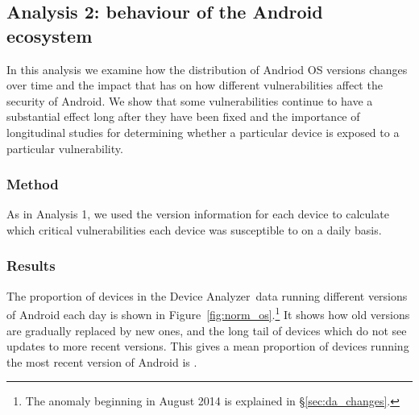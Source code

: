 \documentclass{llncs}
\newcommand{\da}{Device Analyzer}
\begin{document}
\subsection{Analysis 2: behaviour of the Android ecosystem}\label{sec:exp:android_ecosystem}
In this analysis we examine how the distribution of Andriod OS versions changes over time and the impact that has on how different vulnerabilities affect the security of Android.
We show that some vulnerabilities continue to have a substantial effect long after they have been fixed and the importance of longitudinal studies for determining whether a particular device is exposed to a particular vulnerability.

\subsubsection{Method} As in Analysis 1, we used the version information for each device to calculate which critical vulnerabilities each device was susceptible to on a daily basis.

\subsubsection{Results}
The proportion of devices in the \da\ data running different versions of Android each day is shown in Figure~\ref{fig:norm_os}.\footnote{The anomaly beginning in August 2014 is explained in \S\ref{sec:da_changes}.}
It shows how old versions are gradually replaced by new ones, and the long tail of devices which do not see updates to more recent versions.
This gives a mean proportion of devices running the most recent version of Android is \daUpdatednessPerc.
\end{document}
